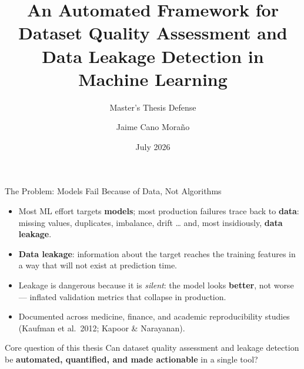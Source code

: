 \documentclass[11pt,aspectratio=169]{beamer}
\title[Dataset Quality \& Leakage Detection]{An Automated Framework for Dataset Quality Assessment and Data Leakage Detection in Machine Learning}
\subtitle{Master's Thesis Defense}
\author[Jaime Cano Moraño]{Jaime Cano Moraño}
\institute[UPM]{ETSIT --- Universidad Politécnica de Madrid \\ Illinois Institute of Technology}
\date{July 2026}
\begin{document}
\begin{frame}
  \titlepage
\end{frame}

\begin{frame}{The Problem: Models Fail Because of Data, Not Algorithms}
  \begin{itemize}\setlength\itemsep{0.6em}
    \item Most ML effort targets \textbf{models}; most production failures trace back to \textbf{data}: missing values, duplicates, imbalance, drift \ldots{} and, most insidiously, \textbf{data leakage}.
    \item \textbf{Data leakage}: information about the target reaches the training features in a way that will not exist at prediction time.
    \item Leakage is dangerous because it is \emph{silent}: the model looks \textbf{better}, not worse --- inflated validation metrics that collapse in production.
    \item Documented across medicine, finance, and academic reproducibility studies (Kaufman et al.\ 2012; Kapoor \& Narayanan).
  \end{itemize}
  \vspace{0.5em}
  \begin{block}{Core question of this thesis}
    Can dataset quality assessment and leakage detection be \textbf{automated, quantified, and made actionable} in a single tool?
  \end{block}
\end{frame}
\end{document}
